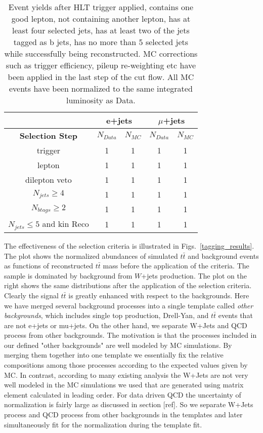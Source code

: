 \documentclass{cmspaperpdf}
\begin{document}
\begin{table}[h!]
\small
\centering
\begin{tabular}{|c | c  c | c  c|}
\hline
 & \multicolumn{2}{|c|}{e+jets}&\multicolumn{2}{|c|}{$\mu$+jets} \\
\hline
\textbf{Selection Step} & $N_{Data}$ & $N_{MC}$ & $N_{Data}$ & $N_{MC}$ \\
\hline
trigger & 1 & 1 & 1 & 1 \\
lepton & 1 & 1 & 1 & 1 \\ 
dilepton veto & 1 & 1 & 1 & 1 \\ 
$N_{jets}\geqslant4$ & 1 & 1 & 1 &1 \\
$N_{btags}\geqslant2$ & 1 & 1 & 1 & 1 \\
$N_{jets}\leqslant5$ and kin Reco & 1 & 1 & 1 & 1 \\
\hline
\end{tabular}
\caption{\small Event yields after HLT trigger applied, contains one good lepton, not containing another lepton, has at least four selected jets, has at least two of the jets tagged as b jets, has no more than 5 selected jets while successfully being reconstructed. MC corrections such as trigger efficiency, pileup re-weighting etc have been applied in the last step of the cut flow. All MC events have been normalized to the same integrated luminosity as Data.}

\label{tab:cut-flow}
\end{table}

The effectiveness of the selection criteria is illustrated in Figs.~\ref{tagging_results}.  The plot shows the normalized abundances of simulated $t\bar t$ and background events as functions of reconstructed $t\bar t$ mass before the application of the criteria.  The sample is dominated by background from $W$+jets production.  The plot on the right shows the same distributions after the application of the selection criteria.  Clearly the signal $t\bar{t}$ is greatly enhanced with respect to the backgrounds.   Here we have merged several background processes into a single template called {\it other backgrounds}, which includes single top production, Drell-Yan, and $t\bar{t}$ events that are not e+jets or mu+jets.  On the other hand, we separate W+Jets and QCD process from other backgrounds. The motivation is that the processes included in our defined "other backgrounds" are well modeled by MC simulations. By merging them together into one template we essentially fix the relative compositions among those processes according to the expected values given by MC.  In contrast, according to many existing analysis the W+Jets are not very well modeled in the MC simulations we used that are generated using matrix element calculated in leading order. For data driven QCD the uncertainty of normalization is fairly large as discussed in section [ref].  So we separate W+Jets process and QCD process from other backgrounds in the templates and later simultaneously fit for the normalization during the template fit.
\end{document}
